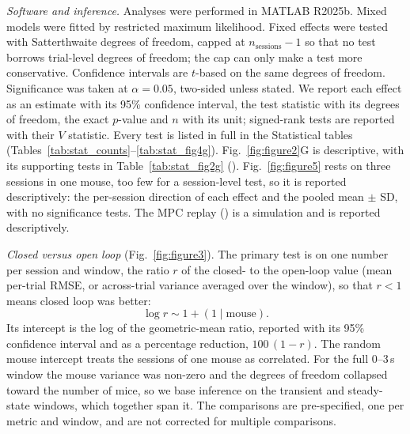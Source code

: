 \emph{Software and inference.} Analyses were performed in MATLAB R2025b. Mixed
models were fitted by restricted maximum likelihood. Fixed effects were
tested with Satterthwaite degrees of freedom, capped at
$n_{\mathrm{sessions}} - 1$ so that no test borrows trial-level degrees of
freedom; the cap can only make a test more conservative. Confidence intervals
are $t$-based on the same degrees of freedom. Significance was taken at
$\alpha = 0.05$, two-sided unless stated. We report each effect as an estimate
with its 95\% confidence interval, the test statistic with its degrees of
freedom, the exact $p$-value and $n$ with its unit; signed-rank tests are
reported with their $V$ statistic. Every test is listed in full in the
Statistical tables (Tables~\ref{tab:stat_counts}--\ref{tab:stat_fig4g}).
Fig.~\ref{fig:figure2}G is descriptive, with its supporting tests in
Table~\ref{tab:stat_fig2g} (). Fig.~\ref{fig:figure5}
rests on three sessions in one mouse, too few for a session-level test, so it is
reported descriptively: the per-session direction of each effect and the pooled
mean $\pm$ SD, with no significance tests. The MPC replay
() is a simulation and is reported descriptively.

\emph{Closed versus open loop} (Fig.~\ref{fig:figure3}). The primary test is on
one number per session and window, the ratio $r$ of the closed- to the open-loop
value (mean per-trial RMSE, or across-trial variance averaged over the window),
so that $r < 1$ means closed loop was better:
\begin{equation*}
    \log r \sim 1 + \left(1 \mid \mathrm{mouse}\right).
\end{equation*}
Its intercept is the log of the geometric-mean ratio, reported with its 95\%
confidence interval and as a percentage reduction, $100\,(1 - r)$. The random
mouse intercept treats the sessions of one mouse as correlated. For the full 0--3\,s window the mouse variance was
non-zero and the degrees of freedom collapsed toward the number of mice, so we
base inference on the transient and steady-state windows, which together span
it. The comparisons are pre-specified, one per metric and window, and are
not corrected for multiple comparisons.


